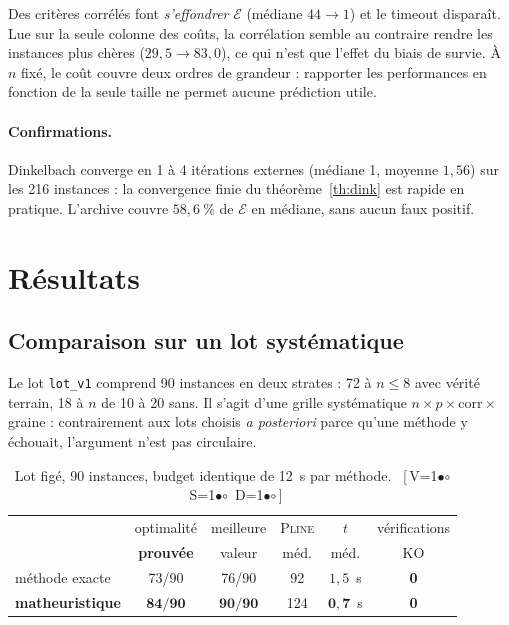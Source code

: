 \documentclass[11pt,a4paper]{article}
\theoremstyle{plain}
\theoremstyle{remark}
\newcommand{\Ecal}{\mathcal{E}}
\newcommand{\ILP}{\textsc{Pline}}
\newcommand{\cfgm}[1]{\ifnum#1=1$\bullet$\else$\circ$\fi}
\newcommand{\conf}[3]{%
  \textsf{\footnotesize[\,V\cfgm{#1}\ S\cfgm{#2}\ D\cfgm{#3}\,]}}
\begin{document}
\noindent
Des critères corrélés font \emph{s'effondrer} $\Ecal$ (médiane $44\to 1$) et
le timeout disparaît. Lue sur la seule colonne des coûts, la corrélation
semble au contraire rendre les instances plus chères ($29{,}5\to 83{,}0$), ce
qui n'est que l'effet du biais de survie. À $n$ fixé, le coût couvre deux
ordres de grandeur : rapporter les performances en fonction de la seule
taille ne permet aucune prédiction utile.

\paragraph{Confirmations.} Dinkelbach converge en 1 à 4 itérations externes
(médiane 1, moyenne $1{,}56$) sur les 216 instances : la convergence finie du
théorème~\ref{th:dink} est rapide en pratique. L'archive couvre $58{,}6\ \%$
de $\Ecal$ en médiane, sans aucun faux positif.

\section{Résultats}
\label{sec:resultats}

\subsection{Comparaison sur un lot systématique}

Le lot \texttt{lot\_v1} comprend 90 instances en deux strates : 72 à
$n\le 8$ avec vérité terrain, 18 à $n$ de 10 à 20 sans. Il s'agit d'une
grille systématique $n\times p\times\text{corr}\times$ graine : contrairement
aux lots choisis \emph{a posteriori} parce qu'une méthode y échouait,
l'argument n'est pas circulaire.

\begin{table}[H]
\centering
\caption{Lot figé, 90 instances, budget identique de 12~s par méthode.\ \conf{0}{0}{0}}
\label{tab:lot}
\setlength{\tabcolsep}{5pt}
\begin{tabular}{lccccc}
\toprule
& optimalité & meilleure & \ILP & $t$ & vérifications\\
& \textbf{prouvée} & valeur & méd. & méd. & KO\\
\midrule
méthode exacte & 73/90 & 76/90 & 92 & $1{,}5$~s & \textbf{0}\\
\textbf{matheuristique} & $\mathbf{84/90}$ & $\mathbf{90/90}$ & 124
& $\mathbf{0{,}7}$~s & \textbf{0}\\
\bottomrule
\end{tabular}
\end{table}
\end{document}
